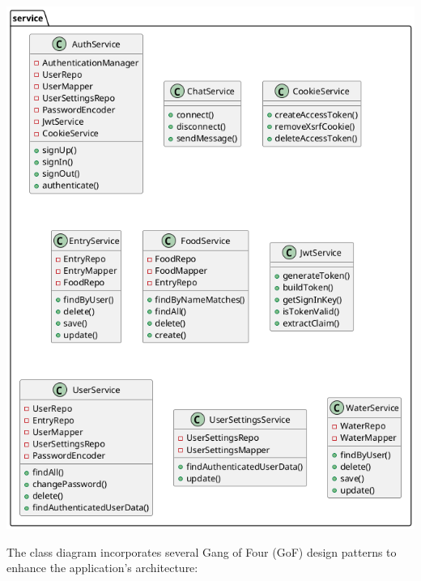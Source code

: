 \documentclass[a4paper,10pt]{article}
\begin{document}
            \includegraphics[width=1\textwidth]{class_service}

            The class diagram incorporates several Gang of Four (GoF) design patterns to enhance the application's architecture:
\end{document}
